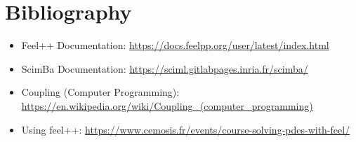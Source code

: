 \documentclass{article}
\begin{document}
\section{Bibliography}

\begin{itemize}
    \item Feel++ Documentation: \url{https://docs.feelpp.org/user/latest/index.html}
    \item ScimBa Documentation: \url{https://sciml.gitlabpages.inria.fr/scimba/}
    \item Coupling (Computer Programming): \url{https://en.wikipedia.org/wiki/Coupling_(computer_programming)}
    \item Using feel++:
    \url{https://www.cemosis.fr/events/course-solving-pdes-with-feel/}
\end{itemize}
\end{document}
